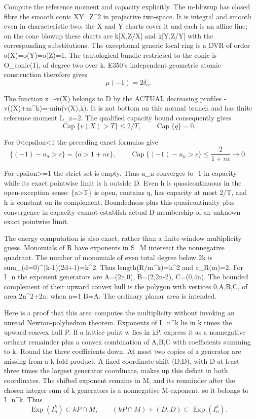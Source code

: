 \documentclass[11pt]{article}
\begin{document}
Compute the reference moment and capacity explicitly. The m-blowup has closed fibre the smooth conic XY=Z\textasciicircum{}2 in projective two-space. It is integral and smooth even in characteristic two: the X and Y charts cover it and each is an affine line; on the cone blowup these charts are k[X,Z/X] and k[Y,Z/Y] with the corresponding substitutions. The exceptional generic local ring is a DVR of order o(X)=o(Y)=o(Z)=1. The tautological bundle restricted to the conic is O\_conic(1), of degree two over k. E350's independent geometric atomic construction therefore gives
\[
\mu(-1)=2\delta_o.
\]

The function z=-v(X) belongs to D by the ACTUAL decreasing profiles -v((X)+m\textasciicircum{}k)=-min(v(X),k). It is not bottom on this normal branch and has finite reference moment L\_z=2. The qualified capacity bound consequently gives
\[
\operatorname{Cap}\{v(X)>T\}\le2/T,\qquad \operatorname{Cap}\{q\}=0.
\]

For 0<epsilon<1 the preceding exact formulas give
\[
\{(-1)-u_n>\epsilon\}=\{a>1+n\epsilon\},\qquad
\operatorname{Cap}\{(-1)-u_n>\epsilon\}\le\frac2{1+n\epsilon}\longrightarrow0.
\]

For epsilon>=1 the strict set is empty. Thus u\_n converges to -1 in capacity while its exact pointwise limit is h outside D. Even h is quasicontinuous in the open-exception sense: \{a>T\} is open, contains q, has capacity at most 2/T, and h is constant on its complement. Boundedness plus this quasicontinuity plus convergence in capacity cannot establish actual D membership of an unknown exact pointwise limit.

The energy computation is also exact, rather than a finite-window multiplicity guess. Monomials of R have exponents in S=M intersect the nonnegative quadrant. The number of monomials of even total degree below 2k is sum\_(d=0)\textasciicircum{}(k-1)(2d+1)=k\textasciicircum{}2. Thus length(R/m\textasciicircum{}k)=k\textasciicircum{}2 and e\_R(m)=2. For I\_n the exponent generators are A=(2n,0), B=(2,2n-2), C=(0,4n). The bounded complement of their upward convex hull is the polygon with vertices 0,A,B,C, of area 2n\textasciicircum{}2+2n; when n=1 B=A. The ordinary planar area is intended.

Here is a proof that this area computes the multiplicity without invoking an unread Newton-polyhedron theorem. Exponents of I\_n\textasciicircum{}k lie in k times the upward convex hull P. If a lattice point w lies in kP, express it as a nonnegative orthant remainder plus a convex combination of A,B,C with coefficients summing to k. Round the three coefficients down. At most two copies of a generator are missing from a k-fold product. A fixed coordinate shift (D,D), with D at least three times the largest generator coordinate, makes up this deficit in both coordinates. The shifted exponent remains in M, and its remainder after the chosen integer sum of k generators is a nonnegative M-exponent, so it belongs to I\_n\textasciicircum{}k. Thus
\[
\operatorname{Exp}(I_n^k)\subset kP\cap M,
\qquad (kP\cap M)+(D,D)\subset\operatorname{Exp}(I_n^k).
\]
\end{document}
